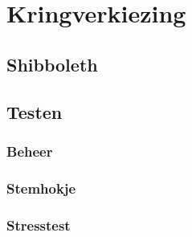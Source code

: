% 
%

\chapter{Kringverkiezing}
\label{chap:kringverkiezing}


\section{Shibboleth}


\section{Testen}


\subsection{Beheer}

\subsection{Stemhokje}

\subsection{Stresstest}
